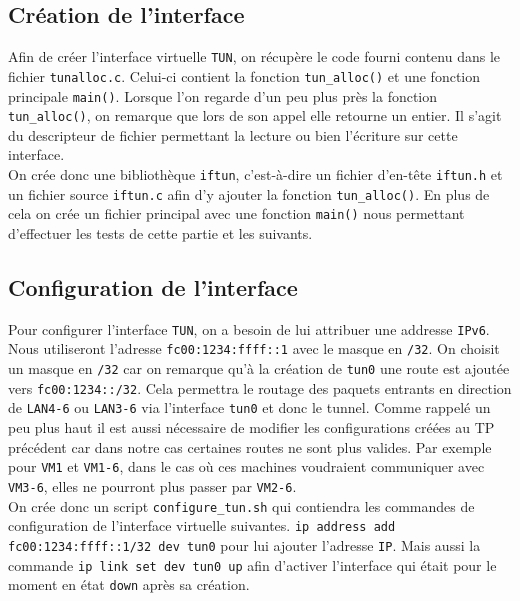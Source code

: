 \documentclass[a4paper, 12pt]{article}
\begin{document}
\begin{spacing}{1.1}
    \subsection{Création de l'interface}
    Afin de créer l'interface virtuelle \verb+TUN+, on récupère le code fourni 
    contenu dans le fichier \verb+tunalloc.c+. Celui-ci contient la fonction 
    \verb+tun_alloc()+ et une fonction principale \verb+main()+. Lorsque l'on 
    regarde d'un peu plus près la fonction \verb+tun_alloc()+, on remarque que 
    lors de son appel elle retourne un entier. Il s'agit du descripteur de 
    fichier permettant la lecture ou bien l'écriture sur cette interface. \\

    On crée donc une bibliothèque \verb+iftun+, c'est-à-dire un fichier 
    d'en-tête \verb+iftun.h+ et un fichier source \verb+iftun.c+ afin d'y 
    ajouter la fonction \verb+tun_alloc()+. En plus de cela on crée un fichier 
    principal avec une fonction \verb+main()+ nous permettant d'effectuer les 
    tests de cette partie et les suivants.

    \subsection{Configuration de l'interface}
    Pour configurer l'interface \verb+TUN+, on a besoin de lui attribuer une 
    addresse \verb+IPv6+. Nous utiliseront l'adresse \verb+fc00:1234:ffff::1+ 
    avec le masque en \verb+/32+. On choisit un masque en \verb+/32+ car on 
    remarque qu'à la création de \verb+tun0+ une route est ajoutée vers 
    \verb+fc00:1234::/32+. Cela permettra le routage des paquets entrants en 
    direction de \verb+LAN4-6+ ou \verb+LAN3-6+ via l'interface \verb+tun0+ et
    donc le tunnel. Comme rappelé un peu plus haut il est aussi nécessaire de 
    modifier les configurations créées au TP précédent car dans notre cas 
    certaines routes ne sont plus valides. Par exemple pour \verb+VM1+ et 
    \verb+VM1-6+, dans le cas où ces machines voudraient communiquer avec 
    \verb+VM3-6+, elles ne pourront plus passer par \verb+VM2-6+. \\

    On crée donc un script \verb+configure_tun.sh+ qui contiendra les commandes
    de configuration de l'interface virtuelle suivantes.
    \verb+ip address add fc00:1234:ffff::1/32 dev tun0+ pour lui ajouter 
    l'adresse \verb+IP+. Mais aussi la commande \verb+ip link set dev tun0 up+
    afin d'activer l'interface qui était pour le moment en état \verb+down+ 
    après sa création. \\


\end{spacing}
\end{document}
